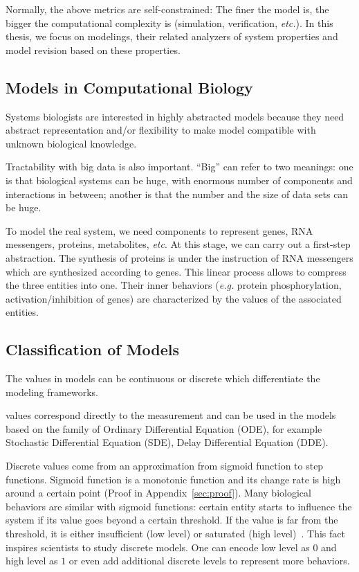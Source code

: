 Normally, the above metrics are self-constrained:
The finer the model is, the bigger the computational complexity is (simulation, verification, \textit{etc.}).
In this thesis, we focus on modelings, their related analyzers of system properties and model revision based on these properties.

\subsection{Models in Computational Biology}
Systems biologists are interested in highly abstracted models because they need abstract representation and/or flexibility to make model compatible with unknown biological knowledge.

Tractability with big data is also important.
``Big'' can refer to two meanings: one is that biological systems can be huge, with enormous number of components and interactions in between; another is that the number and the size of data sets can be huge.

To model the real system, we need components to represent genes, RNA messengers, proteins, metabolites, \textit{etc}.
At this stage, we can carry out a first-step abstraction.
The synthesis of proteins is under the instruction of RNA messengers which are synthesized according to genes.
This linear process allows  to compress the three entities into one.
Their inner behaviors (\textit{e.g.} protein phosphorylation, activation/inhibition of genes) are characterized by the values of the associated entities.

\subsection{Classification of Models}

The values in models can be continuous or discrete which differentiate the modeling frameworks.

 values correspond directly to the measurement and can be used in the models based on the family of Ordinary Differential Equation (ODE), for example Stochastic Differential Equation (SDE), Delay Differential Equation (DDE).

Discrete values come from an approximation from sigmoid function to step functions. 
Sigmoid function is a monotonic function and its change rate is high around a certain point (Proof in Appendix~\ref{sec:proof}).
Many biological behaviors are similar with sigmoid functions: certain entity starts to influence the system if its value goes beyond a certain threshold.
If the value is far from the threshold, it is either insufficient (low level) or saturated (high level)~\cite{kauffman1969,von2000segment}.
This fact inspires scientists to study discrete models.
One can encode low level as $0$ and high level as $1$ or even add additional discrete levels to represent more behaviors.

